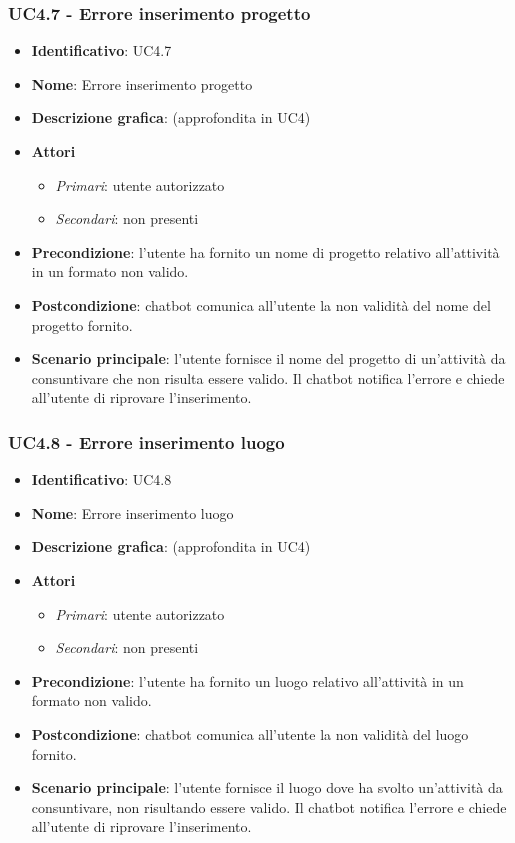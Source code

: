 \subsubsection{UC4.7 - Errore inserimento progetto}
\begin{itemize}
    \item \textbf{Identificativo}: UC4.7
    \item \textbf{Nome}: Errore inserimento progetto
    \item \textbf{Descrizione grafica}: (approfondita in UC4)
    \item \textbf{Attori}
        \begin{itemize} 
            \item \textit{Primari}: utente autorizzato
            \item \textit{Secondari}: non presenti
        \end{itemize}
    \item \textbf{Precondizione}: l'utente ha fornito un nome di progetto relativo all'attività in un formato non valido. 
    \item \textbf{Postcondizione}: chatbot comunica all'utente la non validità del nome del progetto fornito.
    \item \textbf{Scenario principale}: l'utente fornisce il nome del progetto di un'attività da consuntivare che non risulta essere valido. Il chatbot notifica l'errore e chiede all'utente di riprovare l'inserimento. 
\end{itemize}

\subsubsection{UC4.8 - Errore inserimento luogo}
\begin{itemize}
    \item \textbf{Identificativo}: UC4.8
    \item \textbf{Nome}: Errore inserimento luogo
    \item \textbf{Descrizione grafica}: (approfondita in UC4)
    \item \textbf{Attori}
        \begin{itemize} 
            \item \textit{Primari}: utente autorizzato
            \item \textit{Secondari}: non presenti
        \end{itemize}
    \item \textbf{Precondizione}: l'utente ha fornito un luogo relativo all'attività in un formato non valido. 
    \item \textbf{Postcondizione}: chatbot comunica all'utente la non validità del luogo fornito.
    \item \textbf{Scenario principale}: l'utente fornisce il luogo dove ha svolto un'attività da consuntivare, non risultando essere valido. Il chatbot notifica l'errore e chiede all'utente di riprovare l'inserimento. 
\end{itemize}
\newpage